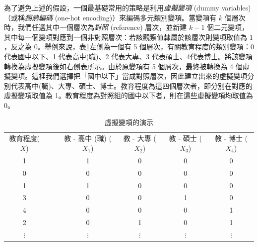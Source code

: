     為了避免上述的假設，一個最基礎常用的策略是利用\textit{虛擬變項} (dummy variables)（或稱\textit{獨熱編碼} (one-hot encoding)）來編碼多元類別變項。當變項有 $k$ 個層次時，我們任選其中一個層次為\textit{對照} (reference) 層次，並新建 $k-1$ 個二元變項，其中每一個變項對應到一個非對照層次：若該觀察值隸屬於該層次則變項取值為 $1$，反之為 $0$。舉例來說，表\ref{tab:dummy_variable}左側為一個有 5 個層次，有關教育程度的類別變項：0 代表國中以下、1 代表高中(職)、2 代表大專、3 代表碩士、4代表博士。將該變項轉換為虛擬變項後如右側表所示。由於原變項有 5 個層次，最終被轉換為 4 個虛擬變項。這裡我們選擇把「國中以下」當成對照層次，因此建立出來的虛擬變項分別代表高中(職)、大專、碩士、博士。教育程度為這四個層次者，即分別在對應的虛擬變項取值為 1。教育程度為對照組的國中以下者，則在這些虛擬變項均取值為 0。

    \begin{table}[htbp]
        \begin{center}
            \begin{tabular}{ccccccc}
                \cline{1-1} \cline{4-7}
                教育程度($X$) &&& 教 - 高中 (職) ($X_1$) & 教 - 大專 ($X_2$) & 教 - 碩士 ($X_3$) & 教 - 博士 ($X_4$)\\
                \cline{1-1} \cline{4-7}
                1 &&& 1 & 0 & 0 & 0\\
                0 &&& 0 & 0 & 0 & 0\\
                1 &&& 1 & 0 & 0 & 0\\
                3 &&& 0 & 0 & 1 & 0\\
                4 &&& 0 & 0 & 0 & 1\\
                2 &&& 0 & 1 & 0 & 1\\
                $\vdots$ &&& $\vdots$ & $\vdots$ & $\vdots$ & $\vdots$ \\
                \cline{1-1} \cline{4-7}
            \end{tabular}
            \caption{虛擬變項的演示\label{tab:dummy_variable}}
        \end{center}
    \end{table}

